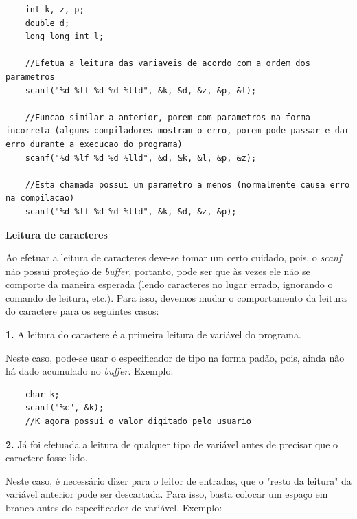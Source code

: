 \documentclass[12pt]{article}
\newcommand\tab[1][1cm]{\hspace*{#1}}
\begin{document}
\hspace{0.25cm}
\begin{lstlisting}
    int k, z, p;
    double d;
    long long int l;
    
    //Efetua a leitura das variaveis de acordo com a ordem dos parametros
    scanf("%d %lf %d %d %lld", &k, &d, &z, &p, &l);
    
    //Funcao similar a anterior, porem com parametros na forma incorreta (alguns compiladores mostram o erro, porem pode passar e dar erro durante a execucao do programa)
    scanf("%d %lf %d %d %lld", &d, &k, &l, &p, &z);
    
    //Esta chamada possui um parametro a menos (normalmente causa erro na compilacao)
    scanf("%d %lf %d %d %lld", &k, &d, &z, &p);
\end{lstlisting}

\par\tab\textbf{Leitura de caracteres}

\par\tab Ao efetuar a leitura de caracteres deve-se tomar um certo cuidado, pois, o \textit{scanf} não possui proteção de \textit{buffer}, portanto, pode ser que às vezes ele não se comporte da maneira esperada (lendo caracteres no lugar errado, ignorando o comando de leitura, etc.). Para isso, devemos mudar o comportamento da leitura do caractere para os seguintes casos:

\par\tab\tab\textbf{1. } A leitura do caractere é a primeira leitura de variável do programa.

\par\tab Neste caso, pode-se usar o especificador de tipo na forma padão, pois, ainda não há dado acumulado no \textit{buffer}. Exemplo:

\hspace{0.25cm}
\begin{lstlisting}
    char k;
    scanf("%c", &k);
    //K agora possui o valor digitado pelo usuario
\end{lstlisting}

\par\tab\tab\textbf{2. } Já foi efetuada a leitura de qualquer tipo de variável antes de precisar que o caractere fosse lido.

\par\tab Neste caso, é necessário dizer para o leitor de entradas, que o "resto da leitura" da variável anterior pode ser descartada. Para isso, basta colocar um espaço em branco antes do especificador de variável. Exemplo:
\end{document}
